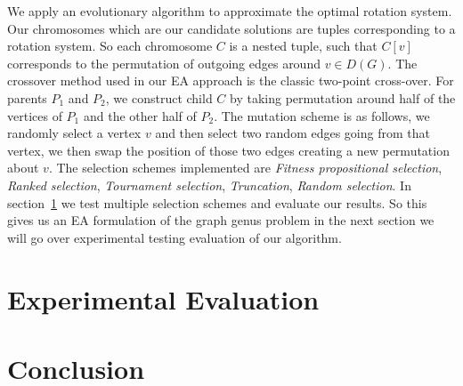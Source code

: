 \documentclass{article}
\newcommand{\classX}[1]{\ensuremath{\text{\textsf{\textbf{#1}}}}}
\newcommand{\classP}{\classX{P}}
\newcommand{\classNP}{\classX{NP}}
\begin{document}
We apply an evolutionary algorithm to approximate the optimal rotation system. 
Our chromosomes which are our candidate solutions are tuples corresponding to a rotation system. So each chromosome $C$ is a nested tuple, such that $C[v]$ corresponds to the permutation of outgoing edges around $v \in D(G)$.
The crossover method used in our EA approach is the classic two-point cross-over. For parents $P_1$ and $P_2$, we construct child $C$ by taking permutation around half of the vertices of $P_1$ and the other half of $P_2$.
The mutation scheme is as follows, we randomly select a vertex $v$ and then select two random edges going from that vertex, we then swap the position of those two edges creating a new permutation about $v$.
The selection schemes implemented are \emph{Fitness propositional selection}, \emph{Ranked selection}, \emph{Tournament selection}, \emph{Truncation}, \emph{Random selection}. In section~\ref{sec: exp} we test multiple selection schemes and evaluate our results.
So this gives us an EA formulation of the graph genus problem in the next section we will go over experimental testing evaluation of our algorithm.
\section{Experimental Evaluation}\label{sec: exp}

\section{Conclusion}\label{sec: con}


    
    
\end{document}
